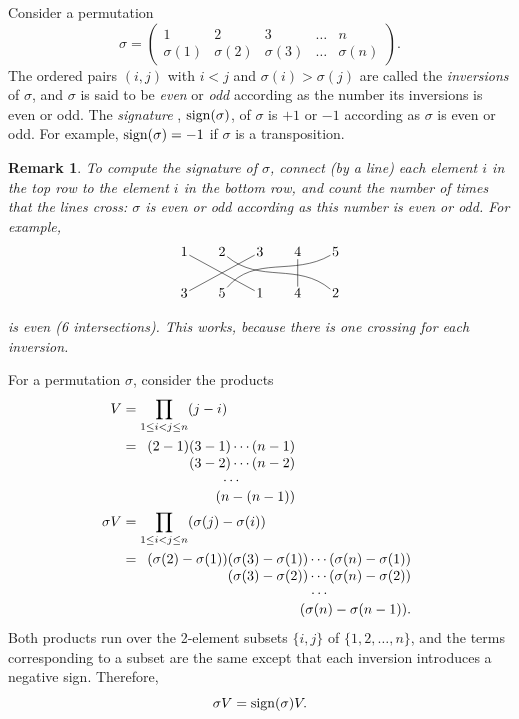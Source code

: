\documentclass[a4paper,11pt,final]{memoir}%
\newtheorem{remark}[X]{Remark}
\theoremstyle{nonumberplain}
\begin{document}
Consider a permutation
\[
\sigma=%
\begin{pmatrix}
1 & 2 & 3 & \ldots & n\\
\sigma(1) & \sigma(2) & \sigma(3) & \ldots & \sigma(n)
\end{pmatrix}
.
\]
The ordered pairs $(i,j)$ with $i<j$ and $\sigma(i)>\sigma(j)$ are called the
\emph{inversions}%
of $\sigma$, and $\sigma$ is said to be \emph{even\/}%
or \emph{odd\/}%
according as the number its inversions is even or odd. The \emph{signature}%
%
, $\operatorname{sign}(\sigma)$,\/ of $\sigma$ is $+1$ or $-1$ according as $\sigma$ is even
or odd. For example, $\operatorname{sign}(\sigma)=-1$ if $\sigma$ is a transposition.

\begin{remark}
\noindent\label{ga20r}To compute the signature of $\sigma$, connect (by a
line) each element $i$ in the top row to the element $i$ in the bottom row,
and count the number of times that the lines cross: $\sigma$ is even or odd
according as this number is even or odd. For example,
\[
\begin{tikzpicture}[inner sep=1pt]
\matrix(m)[matrix of math nodes, row sep=2em, column sep=2em,
text height=1.5ex, text depth=0.25ex]
{1&2&3&4&5\\
3&5&1&4&2\\};
\path[-]
(m-1-1) edge (m-2-3)
(m-1-2) edge[out=320,in=140] (m-2-5)
(m-1-3) edge (m-2-1)
(m-1-4) edge (m-2-4)
(m-1-5) edge[out=210,in=50] (m-2-2);
\end{tikzpicture}
\]
is even (6 intersections). This works, because there is one crossing for each inversion.
\end{remark}

For a permutation $\sigma$, consider the products
\begin{align*}
V&=\prod_{1\leq i<j\leq n}(j-i)  \\
 &=%
\begin{array}
[t]{r}%
(2-1)(3-1)\cdots(n-1)\\
(3-2)\cdots(n-2)\\
\cdots\qquad\qquad\\
(n-(n-1))
\end{array}
\\
\sigma V&=\prod_{1\leq i<j\leq n}(\sigma(j)-\sigma(i))  \\
  &=%
\begin{array}
[t]{r}%
(\sigma(2)-\sigma(1))(\sigma(3)-\sigma(1))\cdots(\sigma(n)-\sigma(1))\\
(\sigma(3)-\sigma(2))\cdots(\sigma(n)-\sigma(2))\\
\cdots\qquad\qquad\qquad\\
(\sigma(n)-\sigma(n-1)).
\end{array}
\end{align*}
Both products run over the 2-element subsets $\{i,j\}$ of $\{1,2,\ldots,n\}$,
and the terms corresponding to a subset are the same except that each
inversion introduces a negative sign. Therefore,%
\[
\sigma V=\operatorname{sign}(\sigma)V.
\]
\end{document}
